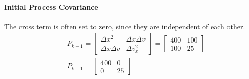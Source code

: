 \paragraph{Initial Process Covariance}
The cross term is often set to zero, since they are independent of each other.
$$
\begin{aligned}
&P_{k-1}=\left[\begin{array}{cc}
\Delta x^2 & \Delta x \Delta v \\
\Delta x \Delta v & \Delta v_x^2
\end{array}\right]=\left[\begin{array}{ll}
400 & 100 \\
100 & 25
\end{array}\right] \\
&P_{k-1}=\left[\begin{array}{cc}
400 & 0 \\
0 & 25
\end{array}\right]
\end{aligned}
$$
